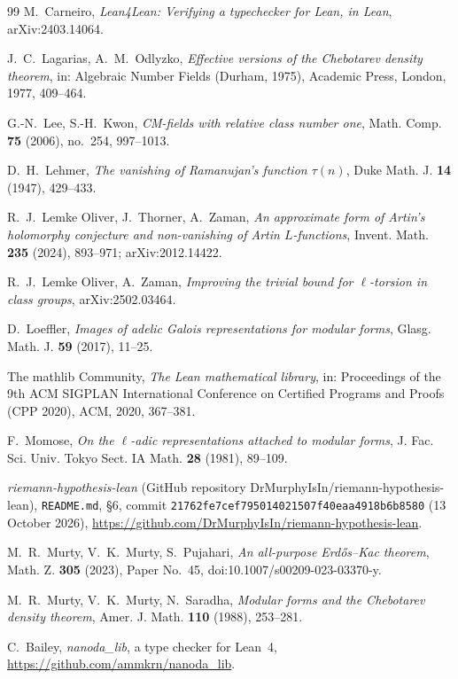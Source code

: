 \documentclass[11pt]{amsart}
\theoremstyle{definition}
\theoremstyle{remark}
\begin{document}
\begin{thebibliography}{99}
M.~Carneiro, \emph{Lean4Lean: Verifying a typechecker for Lean, in Lean}, arXiv:2403.14064.

J.~C.~Lagarias, A.~M.~Odlyzko, \emph{Effective versions of the Chebotarev density theorem}, in: Algebraic Number Fields
(Durham, 1975), Academic Press, London, 1977, 409--464.

G.-N.~Lee, S.-H.~Kwon, \emph{CM-fields with relative class number one}, Math. Comp. \textbf{75} (2006), no.~254,
997--1013.

D.~H.~Lehmer, \emph{The vanishing of Ramanujan's function $\tau(n)$}, Duke Math. J. \textbf{14} (1947), 429--433.

R.~J.~Lemke Oliver, J.~Thorner, A.~Zaman, \emph{An approximate form of Artin's holomorphy conjecture and non-vanishing
of Artin $L$-functions}, Invent. Math. \textbf{235} (2024), 893--971; arXiv:2012.14422.

R.~J.~Lemke Oliver, A.~Zaman, \emph{Improving the trivial bound for $\ell$-torsion in class groups}, arXiv:2502.03464.

D.~Loeffler, \emph{Images of adelic Galois representations for modular forms}, Glasg. Math. J. \textbf{59} (2017),
11--25.

The mathlib Community, \emph{The Lean mathematical library}, in: Proceedings of the 9th ACM SIGPLAN International
Conference on Certified Programs and Proofs (CPP 2020), ACM, 2020, 367--381.

F.~Momose, \emph{On the $\ell$-adic representations attached to modular forms}, J. Fac. Sci. Univ. Tokyo Sect. IA
Math. \textbf{28} (1981), 89--109.

\emph{riemann-hypothesis-lean} (GitHub repository DrMurphyIsIn/riemann-hypothesis-lean), \texttt{README.md}, \S6,
commit \texttt{21762fe7cef795014021507f40eaa4918b6b8580} (13 October 2026),
\url{https://github.com/DrMurphyIsIn/riemann-hypothesis-lean}.

M.~R.~Murty, V.~K.~Murty, S.~Pujahari, \emph{An all-purpose Erd\H{o}s--Kac theorem}, Math. Z. \textbf{305} (2023),
Paper No.~45, doi:10.1007/s00209-023-03370-y.

M.~R.~Murty, V.~K.~Murty, N.~Saradha, \emph{Modular forms and the Chebotarev density theorem}, Amer. J. Math.
\textbf{110} (1988), 253--281.

C.~Bailey, \emph{nanoda\_lib}, a type checker for Lean~4, \url{https://github.com/ammkrn/nanoda_lib}.


\end{thebibliography}
\end{document}
